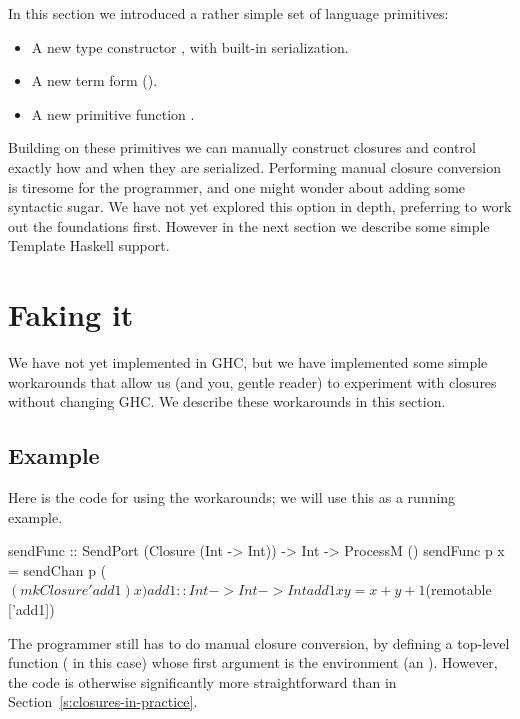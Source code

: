 \documentclass[preprint]{sigplanconf}
\begin{document}
In this section we introduced a rather simple set of language primitives:
\begin{itemize}
\item A new type constructor , with built-in serialization.
\item A new term form ($\!$).
\item A new primitive function .
\end{itemize}


\lstset{mathescape=false}

Building on these primitives we can manually construct closures and
control exactly how and when they are serialized.
Performing manual closure conversion is tiresome for the programmer,
and one might wonder about adding some syntactic sugar.
We have not yet explored this option in depth, preferring to work out the
foundations first.
However in the next section we describe some simple Template Haskell support.


\section{Faking it}
\label{s:faking}

We have not yet implemented  in GHC, but we have implemented
some simple workarounds that allow us (and you, gentle reader) to experiment
with closures without changing GHC.  We describe these workarounds in this section.

\subsection{Example}
Here is the code for  using the workarounds; we will use this as a running example.
\begin{code}
  sendFunc :: SendPort (Closure (Int -> Int)) 
                              -> Int -> ProcessM ()
  sendFunc p x = sendChan p ($(mkClosure 'add1) x)

  add1 :: Int -> Int -> Int
  add1 x y = x + y + 1

  $(remotable ['add1])
\end{code}
The programmer still has to do manual closure conversion, by defining
a top-level function ( in this case) whose first argument is
the environment (an ).  However, the code is otherwise significantly more 
straightforward than in Section~\ref{s:closures-in-practice}.
\end{document}
